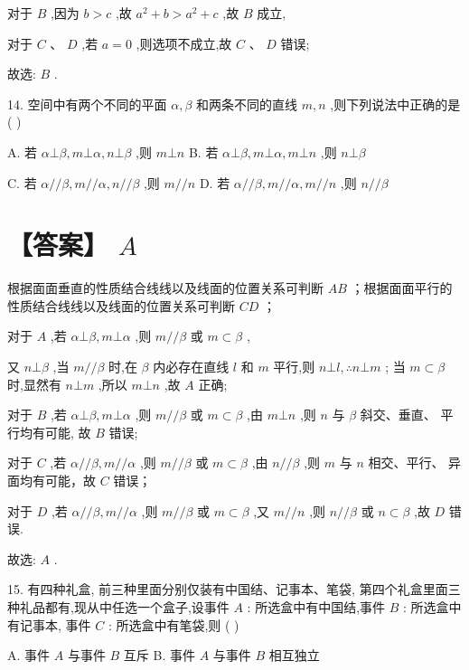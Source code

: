 \documentclass[10pt]{article}
\begin{document}
对于 \(B\) ,因为 \(b > c\) ,故 \({a}^{2} + b > {a}^{2} + c\) ,故 \(B\) 成立,

对于 \(C\text{ 、 }D\) ,若 \(a = 0\) ,则选项不成立,故 \(C\text{ 、 }D\) 错误;

故选: \(B\) .

14. 空间中有两个不同的平面 \(\alpha ,\beta\) 和两条不同的直线 \(m,n\) ,则下列说法中正确的是 ( )

A. 若 \(\alpha  \bot  \beta ,m \bot  \alpha ,n \bot  \beta\) ,则 \(m \bot  n\) B. 若 \(\alpha  \bot  \beta ,m \bot  \alpha ,m \bot  n\) ,则 \(n \bot  \beta\)

C. 若 \(\alpha //\beta ,m//\alpha ,n//\beta\) ,则 \(m//n\) D. 若 \(\alpha //\beta ,m//\alpha ,m//n\) ,则 \(n//\beta\)

\section*{【答案】 \(A\)}

根据面面垂直的性质结合线线以及线面的位置关系可判断 \({AB}\) ；根据面面平行的性质结合线线以及线面的位置关系可判断 \({CD}\) ；

对于 \(A\) ,若 \(\alpha  \bot  \beta ,m \bot  \alpha\) ,则 \(m//\beta\) 或 \(m \subset  \beta\) ,

又 \(n \bot  \beta\) ,当 \(m//\beta\) 时,在 \(\beta\) 内必存在直线 \(l\) 和 \(m\) 平行,则 \(n \bot  l,\therefore n \bot  m\) ; 当 \(m \subset  \beta\) 时,显然有 \(n \bot  m\) ,所以 \(m \bot  n\) ,故 \(A\) 正确;

对于 \(B\) ,若 \(\alpha  \bot  \beta ,m \bot  \alpha\) ,则 \(m//\beta\) 或 \(m \subset  \beta\) ,由 \(m \bot  n\) ,则 \(n\) 与 \(\beta\) 斜交、垂直、 平行均有可能, 故 \(B\) 错误;

对于 \(C\) ,若 \(\alpha //\beta ,m//\alpha\) ,则 \(m//\beta\) 或 \(m \subset  \beta\) ,由 \(n//\beta\) ,则 \(m\) 与 \(n\) 相交、平行、 异面均有可能，故 \(C\) 错误；

对于 \(D\) ,若 \(\alpha //\beta ,m//\alpha\) ,则 \(m//\beta\) 或 \(m \subset  \beta\) ,又 \(m//n\) ,则 \(n//\beta\) 或 \(n \subset  \beta\) ,故 \(D\) 错误.

故选: \(A\) .

15. 有四种礼盒, 前三种里面分别仅装有中国结、记事本、笔袋, 第四个礼盒里面三种礼品都有,现从中任选一个盒子,设事件 \(A\) : 所选盒中有中国结,事件 \(B\) : 所选盒中有记事本, 事件 \(C\) : 所选盒中有笔袋,则 ( )

A. 事件 \(A\) 与事件 \(B\) 互斥 B. 事件 \(A\) 与事件 \(B\) 相互独立
\end{document}
